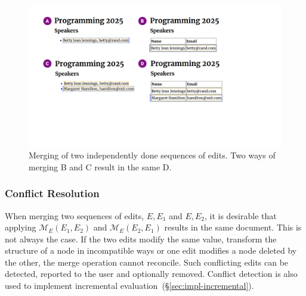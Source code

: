 \documentclass[sigconf,anonymous,screen]{acmart}
\begin{document}
\begin{figure}[t]
\includegraphics[width=0.95\columnwidth,clip,trim=1.7cm 6cm 7.8cm 1.5cm]{fig/merging.pdf}
\caption{Merging of two independently done sequences of edits. Two ways of merging B and C result in the same D.}
\label{fig:merging}
\end{figure}


\subsubsection*{Conflict Resolution}
When merging two sequences of edits, $E, E_1$ and $E, E_2$, it is desirable that
applying $\mathcal{M}_E(E_1, E_2)$ and $\mathcal{M}_E(E_2, E_1)$ results in the same document.
This is not always the case. If the two edits modify the same value, transform the structure of
a node in incompatible ways or one edit modifies a node deleted by the other, the merge operation
cannot reconcile. Such conflicting edits can be detected, reported to the user and optionally
removed. Conflict detection is also used to implement incremental evaluation~(\S\ref{sec:impl-incremental}).

%
\end{document}

